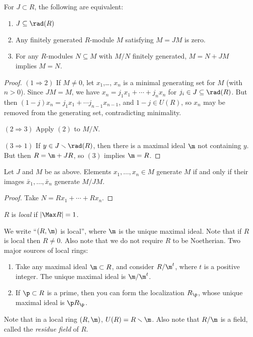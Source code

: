  \begin{lemma}
   For $J\subset R$, the following are equivalent:
   \begin{enumerate}
     \item $J\subseteq \rad(R)$
     \item Any finitely generated $R$-module $M$ satisfying $M=JM$ is zero.
     \item For any $R$-modules $N\subseteq M$ with $M/N$ finitely generated, $M=N+JM$
     implies $M=N$.
   \end{enumerate}
 \end{lemma}
 \begin{proof}
   $(1\Rightarrow 2)$ If $M\neq 0$, let $x_1$,\dots, $x_n$ is a minimal generating set
   for $M$ (with $n>0$). Since $JM = M$, we have $x_n= j_1 x_1+ \cdots + j_n
   x_n$ for $j_i\in J\subseteq \rad(R)$. But then $(1-j)x_n = j_1x_1+\cdots
   j_{n-1}x_{n-1}$, and $1-j\in U(R)$, so $x_n$ may be removed from the generating set,
   contradicting minimality.

   $(2\Rightarrow 3)$ Apply $(2)$ to $M/N$.

   $(3\Rightarrow 1)$ If $y\in J\smallsetminus \rad(R)$, then there is a maximal ideal
   $\m$ not containing $y$. But then $R = \m + JR$, so $(3)$ implies $\m=R$.
 \end{proof}

 \begin{corollary}[2.10]
   Let $J$ and $M$ be as above. Elements $x_1,\dots,x_n\in M$ generate $M$ if and only if
   their images $\bar x_1,\dots, \bar x_n$ generate $M/JM$.
 \end{corollary}
 \begin{proof}
   Take $N=Rx_1+\cdots + Rx_n$.
 \end{proof}

 \begin{definition}
   $R$ is \emph{local} if $|\Max R|=1$.
 \end{definition}
 We write ``$(R,\m)$ is local'', where $\m$ is the unique maximal ideal. Note that if
 $R$ is local then $R\neq 0$. Also note that we do not require $R$ to be Noetherian.
 \noindent Two major sources of local rings:
 \begin{enumerate}
   \item Take any maximal ideal $\m\subset R$, and consider $R/\m^t$, where $t$ is a positive
   integer. The unique maximal ideal is $\m/\m^t$.

   \item If $\p\subset R$ is a prime, then you can form the localization $R_\p$, whose unique
   maximal ideal is $\p R_\p$.
 \end{enumerate}
 Note that in a local ring $(R,\m)$, $U(R)=R\smallsetminus \m$. Also note that $R/\m$ is
 a field, called the \emph{residue field} of $R$.


